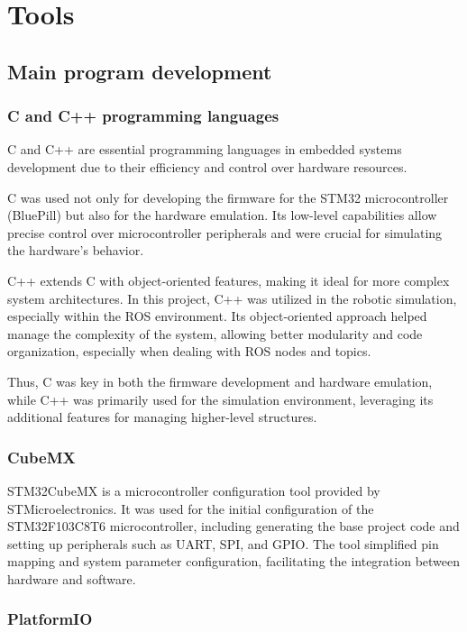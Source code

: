 \documentclass[../../monografia.tex]{subfiles}
\begin{document}
\section{Tools}

\subsection{Main program development}

\subsubsection{C and C++ programming languages}
C and C++ are essential programming languages in embedded systems development due to their efficiency and control over hardware resources.

C was used not only for developing the firmware for the STM32 microcontroller (BluePill) but also for the hardware emulation. Its low-level capabilities allow precise control over microcontroller peripherals and were crucial for simulating the hardware's behavior.

C++ extends C with object-oriented features, making it ideal for more complex system architectures. In this project, C++ was utilized in the robotic simulation, especially within the ROS environment. Its object-oriented approach helped manage the complexity of the system, allowing better modularity and code organization, especially when dealing with ROS nodes and topics.

Thus, C was key in both the firmware development and hardware emulation, while C++ was primarily used for the simulation environment, leveraging its additional features for managing higher-level structures.

\subsubsection{CubeMX}

STM32CubeMX is a microcontroller configuration tool provided by STMicroelectronics. It was used for the initial configuration of the STM32F103C8T6 microcontroller, including generating the base project code and setting up peripherals such as UART, SPI, and GPIO. The tool simplified pin mapping and system parameter configuration, facilitating the integration between hardware and software.

\subsubsection{PlatformIO}
\end{document}
